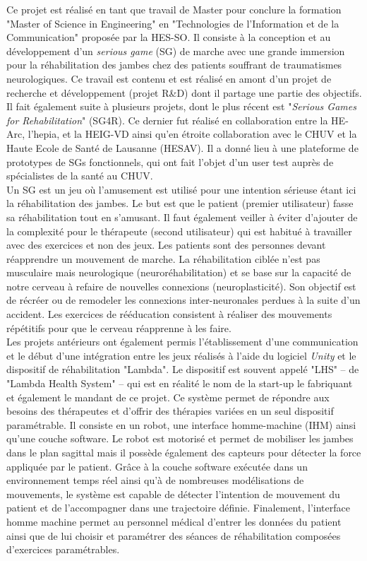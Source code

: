 Ce projet est réalisé en tant que travail de Master pour conclure la formation "Master of Science in Engineering" en "Technologies de l'Information et de la Communication" proposée par la HES-SO. Il consiste à la conception et au développement d'un \textit{serious game} (SG) de marche avec une grande immersion pour la réhabilitation des jambes chez des patients souffrant de traumatismes neurologiques. Ce travail est contenu et est réalisé en amont d'un projet de recherche et développement (projet R\&D) dont il partage une partie des objectifs. Il fait également suite à plusieurs projets, dont le plus récent est "\textit{Serious Games for Rehabilitation}" (SG4R). Ce dernier fut réalisé en collaboration entre la HE-Arc, l'hepia, et la HEIG-VD ainsi qu'en étroite collaboration avec le CHUV et la Haute Ecole de Santé de Lausanne (HESAV). Il a donné lieu à une plateforme de prototypes de SGs fonctionnels, qui ont fait l'objet d'un user test auprès de spécialistes de la santé au CHUV.
\\

Un SG est un jeu où l'amusement est utilisé pour une intention sérieuse étant ici la réhabilitation des jambes. Le but est que le patient (premier utilisateur) fasse sa réhabilitation tout en s'amusant. Il faut également veiller à éviter d'ajouter de la complexité pour le thérapeute (second utilisateur) qui est habitué à travailler avec des exercices et non des jeux. Les patients sont des personnes devant réapprendre un mouvement de marche. La réhabilitation ciblée n'est pas musculaire mais neurologique (neuroréhabilitation) et se base sur la capacité de notre cerveau à refaire de nouvelles connexions (neuroplasticité). Son objectif est de récréer ou de remodeler les connexions inter-neuronales perdues à la suite d’un accident. Les exercices de rééducation consistent à réaliser des mouvements répétitifs pour que le cerveau réapprenne à les faire. %
\\

Les projets antérieurs ont également permis l'établissement d'une communication et le début d'une intégration entre les jeux réalisés à l'aide du logiciel \textit{Unity} et le dispositif de réhabilitation "Lambda". Le dispositif est souvent appelé "LHS" -- de "Lambda Health System" -- qui est en réalité le nom de la start-up le fabriquant et également le mandant de ce projet. Ce système permet de répondre aux besoins des thérapeutes et d'offrir des thérapies variées en un seul dispositif paramétrable. Il consiste en un robot, une interface homme-machine (IHM) ainsi qu'une couche software.
Le robot est motorisé et permet de mobiliser les jambes dans le plan sagittal mais il possède également des capteurs pour détecter la force appliquée par le patient. Grâce à la couche software exécutée dans un environnement temps réel ainsi qu'à de nombreuses modélisations de mouvements, le système est capable de détecter l'intention de mouvement du patient et de l'accompagner dans une trajectoire définie. Finalement, l'interface homme machine permet au personnel médical d'entrer les données du patient ainsi que de lui choisir et paramétrer des séances de réhabilitation composées d'exercices paramétrables.
\\

